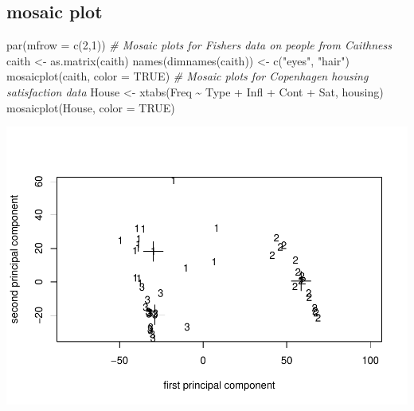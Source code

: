 \documentclass[
]{article}
\newenvironment{Shaded}{\begin{snugshade}}{\end{snugshade}}
\newcommand{\AttributeTok}[1]{\textcolor[rgb]{0.77,0.63,0.00}{#1}}
\newcommand{\CommentTok}[1]{\textcolor[rgb]{0.56,0.35,0.01}{\textit{#1}}}
\newcommand{\ConstantTok}[1]{\textcolor[rgb]{0.00,0.00,0.00}{#1}}
\newcommand{\DecValTok}[1]{\textcolor[rgb]{0.00,0.00,0.81}{#1}}
\newcommand{\FunctionTok}[1]{\textcolor[rgb]{0.00,0.00,0.00}{#1}}
\newcommand{\NormalTok}[1]{#1}
\newcommand{\OtherTok}[1]{\textcolor[rgb]{0.56,0.35,0.01}{#1}}
\newcommand{\SpecialCharTok}[1]{\textcolor[rgb]{0.00,0.00,0.00}{#1}}
\newcommand{\StringTok}[1]{\textcolor[rgb]{0.31,0.60,0.02}{#1}}
\begin{document}
\hypertarget{mosaic-plot}{%
\subsection{mosaic plot}\label{mosaic-plot}}

\begin{Shaded}
\begin{Highlighting}[]
\FunctionTok{par}\NormalTok{(}\AttributeTok{mfrow =} \FunctionTok{c}\NormalTok{(}\DecValTok{2}\NormalTok{,}\DecValTok{1}\NormalTok{))}
\CommentTok{\# Mosaic plots for Fisher\textquotesingle{}s data on people from Caithness}
\NormalTok{caith }\OtherTok{\textless{}{-}} \FunctionTok{as.matrix}\NormalTok{(caith)}
\FunctionTok{names}\NormalTok{(}\FunctionTok{dimnames}\NormalTok{(caith)) }\OtherTok{\textless{}{-}} \FunctionTok{c}\NormalTok{(}\StringTok{"eyes"}\NormalTok{, }\StringTok{"hair"}\NormalTok{)}
\FunctionTok{mosaicplot}\NormalTok{(caith, }\AttributeTok{color =} \ConstantTok{TRUE}\NormalTok{)}
\CommentTok{\# Mosaic plots for Copenhagen housing satisfaction data}
\NormalTok{House }\OtherTok{\textless{}{-}} \FunctionTok{xtabs}\NormalTok{(Freq }\SpecialCharTok{\textasciitilde{}}\NormalTok{ Type }\SpecialCharTok{+}\NormalTok{ Infl }\SpecialCharTok{+}\NormalTok{ Cont }\SpecialCharTok{+}\NormalTok{ Sat, housing)}
\FunctionTok{mosaicplot}\NormalTok{(House, }\AttributeTok{color =} \ConstantTok{TRUE}\NormalTok{)}
\end{Highlighting}
\end{Shaded}

\includegraphics{modern_applied_statistics_CH11_files/figure-latex/unnamed-chunk-23-1.pdf}

\newpage
\end{document}
